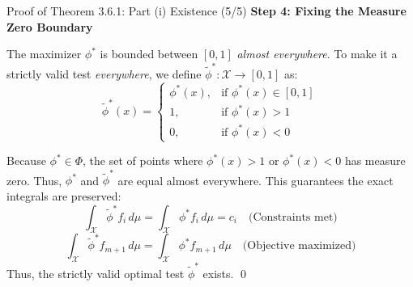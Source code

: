\documentclass[10pt, aspectratio=169, xcolor=dvipsnames]{beamer}
\newcommand{\lead}[1]{{\color{UniBlue}\bfseries #1}}
\begin{document}
\begin{frame}{Proof of Theorem 3.6.1: Part (i) Existence (5/5)}
    \lead{Step 4: Fixing the Measure Zero Boundary}
    
    \vspace{0.2cm}
    The maximizer $\phi^*$ is bounded between $[0,1]$ \textit{almost everywhere}. To make it a strictly valid test \textit{everywhere}, we define $\tilde{\phi}^* : \mathcal{X} \to [0,1]$ as:
    \[
    \tilde{\phi}^*(x) = \begin{cases} 
    \phi^*(x), & \text{if } \phi^*(x) \in [0,1] \\
    1, & \text{if } \phi^*(x) > 1 \\
    0, & \text{if } \phi^*(x) < 0 
    \end{cases}
    \]
    
    \vspace{0.1cm}
    Because $\phi^* \in \Phi$, the set of points where $\phi^*(x) > 1$ or $\phi^*(x) < 0$ has measure zero. Thus, $\phi^*$ and $\tilde{\phi}^*$ are equal almost everywhere. This guarantees the exact integrals are preserved:
    \[ \int_{\mathcal{X}} \tilde{\phi}^* f_i \, d\mu = \int_{\mathcal{X}} \phi^* f_i \, d\mu = c_i \quad \text{(Constraints met)} \]
    \[ \int_{\mathcal{X}} \tilde{\phi}^* f_{m+1} \, d\mu = \int_{\mathcal{X}} \phi^* f_{m+1} \, d\mu \quad \text{(Objective maximized)} \]
    Thus, the strictly valid optimal test $\tilde{\phi}^*$ exists. \qed
\end{frame}
\end{document}
